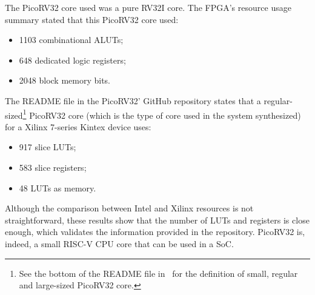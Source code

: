 The PicoRV32 core used was a pure RV32I core. The FPGA's resource usage summary
stated that this PicoRV32 core used:
\begin{itemize}
	\item 1103 combinational ALUTs;
	\item 648 dedicated logic registers;
	\item 2048 block memory bits.
\end{itemize}

The README file in the PicoRV32' GitHub repository states that a
regular-sized\footnote{See the bottom of the README file in~\cite{bib:picorv32}
  for the definition of small, regular and large-sized PicoRV32 core.} PicoRV32
core (which is the type of core used in the system synthesized) for a Xilinx
7-series Kintex device uses:

\begin{itemize}
	\item 917 slice LUTs;
	\item 583 slice registers;
	\item 48 LUTs as memory.
\end{itemize}

Although the comparison between Intel and Xilinx resources is not
straightforward, these results show that the number of LUTs and registers is
close enough, which validates the information provided in the repository. PicoRV32 is,
indeed, a small RISC-V CPU core that can be used in a SoC.
